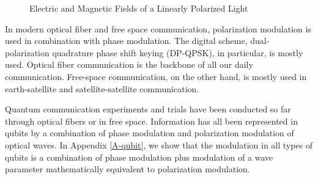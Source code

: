 \documentclass[oneside, letter, 12pt]{book}
\begin{document}
\begin{figure}[h]\label{Polarization}
\caption{Electric and Magnetic Fields of a Linearly Polarized Light}
\end{figure}


In modern optical fiber and free space communication, polarization modulation is used in combination with phase modulation. The digital scheme, dual-polarization quadrature phase shift keying (DP-QPSK), in particular, is mostly used. Optical fiber communication is the backbone of all our daily communication. Free-space communication, on the other hand, is mostly used in earth-satellite and satellite-satellite communication.

Quantum communication experiments and trials have been conducted so far through optical fibers or in free space. Information has all been represented in qubits by a combination of phase modulation and polarization modulation of optical waves. In Appendix \ref{A-qubit}, we show that the modulation in all types of qubits is a combination of phase modulation plus modulation of a wave parameter mathematically equivalent to polarization modulation.
\end{document}
